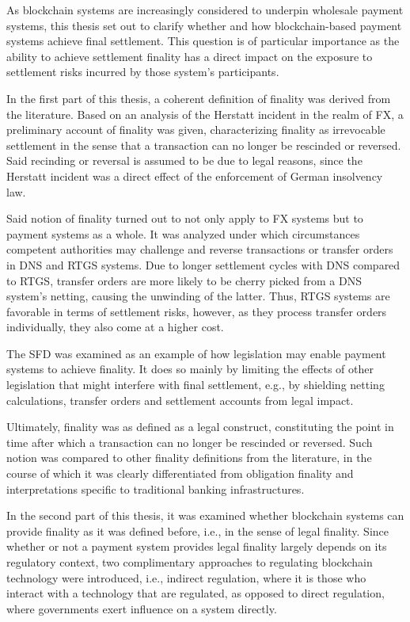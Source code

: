 As blockchain systems are increasingly considered to underpin wholesale payment systems, this thesis set out to clarify whether and how blockchain-based payment systems achieve final settlement.
This question is of particular importance as the ability to achieve settlement finality has a direct impact on the exposure to settlement risks incurred by those system's participants.

In the first part of this thesis, a coherent definition of finality was derived from the literature.
Based on an analysis of the Herstatt incident in the realm of FX, a preliminary account of finality was given, characterizing finality as irrevocable settlement in the sense that a transaction can no longer be rescinded or reversed.
Said recinding or reversal is assumed to be due to legal reasons, since the Herstatt incident was a direct effect of the enforcement of German insolvency law.

Said notion of finality turned out to not only apply to FX systems but to payment systems as a whole.
It was analyzed under which circumstances competent authorities may challenge and reverse transactions or transfer orders in DNS and RTGS systems.
Due to longer settlement cycles with DNS compared to RTGS, transfer orders are more likely to be cherry picked from a DNS system's netting, causing the unwinding of the latter.
Thus, RTGS systems are favorable in terms of settlement risks, however, as they process transfer orders individually, they also come at a higher cost.

The SFD was examined as an example of how legislation may enable payment systems to achieve finality.
It does so mainly by limiting the effects of other legislation that might interfere with final settlement, e.g., by shielding netting calculations, transfer orders and settlement accounts from legal impact.

Ultimately, finality was as defined as a legal construct, constituting the point in time after which a transaction can no longer be rescinded or reversed.
Such notion was compared to other finality definitions from the literature, in the course of which it was clearly differentiated from obligation finality and interpretations specific to traditional banking infrastructures.

In the second part of this thesis, it was examined whether blockchain systems can provide finality as it was defined before, i.e., in the sense of legal finality.
Since whether or not a payment system provides legal finality largely depends on its regulatory context, two complimentary approaches to regulating blockchain technology were introduced, i.e., indirect regulation, where it is those who interact with a technology that are regulated, as opposed to direct regulation, where governments exert influence on a system directly. 

